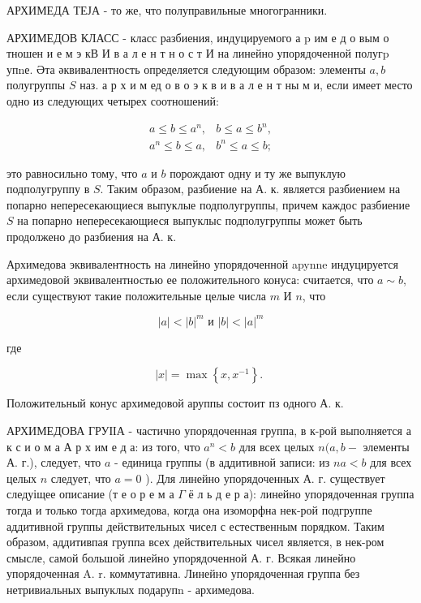 \documentclass[10pt]{article}
\begin{document}
АРХИМЕДА ТЕЈА - то же, что полуправильные многогранники.



АРХИМЕДОВ КЛАСС - класс разбиения, индуцируемого а $\mathrm{p}$ им е д о вым о тношен и е м э кВ И в а л е н т н о с т И на линейно упорядоченной полугp упnе. Әта әквивалентность определяется следующим образом: элементы $a, b$ полугруппы $S$ наз. а р х и м ед о в о э к в и в а л е н т ны м и, если имеет место одно из следующих четырех соотношений:



\[

\begin{array}{ll}

a \leqslant b \leqslant a^{n}, & b \leqslant a \leqslant b^{n}, \\

a^{n} \leqslant b \leqslant a, & b^{n} \leqslant a \leqslant b ;

\end{array}

\]



это равносильно тому, что $a$ и $b$ порождают одну и ту же выпуклую подполугруппу в $S$. Таким образом, разбиение на А. к. является разбиением на попарно непересекающиеся выпуклые подполугруппы, причем каждос разбиение $S$ на попарно непересекающиеся выпуклыс подполугруппы может быть продолжено до разбиения на А. к.



Архимедова эквивалентность на линейно упорядоченной apynne индуцируется архимедовой эквивалентностью ее положительного конуса: считается, что $a \sim b$, если существуют такие положительные целые числа $m$ И $n$, что



\[

|a|<|b|^{m} \text { и }|b|<|a|^{m}

\]



где



\[

|x|=\max \left\{x, x^{-1}\right\} \text {. }

\]



Положительный конус архимедовой аруппы состоит пз одного А. к.



АРХИМЕДОВА ГРУІІА - частично упорядоченная группа, в к-рой выполняется а к с и о м а А р х им е д а: из того, что $a^{n}<b$ для всех целых $n(a, b-$ элементы А. г.), следует, что $a$ - единица группы (в аддитивной записи: из $n a<b$ для всех целых $n$ следует, что $a=0$ ). Для линейно упорядоченных А. г. существует следуіщее описание (т е о р е м а $\Gamma$ ё л ь д е р а): линейно упорядоченная группа тогда и только тогда архимедова, когда она изоморфна нек-рой подгруппе аддитивной группы действительных чисел с естественным порядком. Таким образом, аддитивпая группа всех действительных чисел является, в нек-ром смысле, самой большой линейно упорядоченной А. г. Всякая линейно упорядоченная A. r. коммутативна. Линейно упорядоченная группа без нетривиальных выпуклых подарупn - архимедова.
\end{document}

